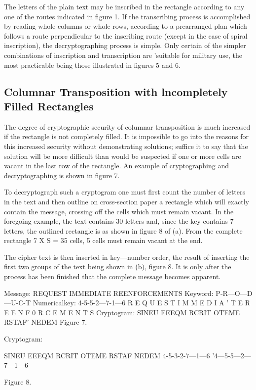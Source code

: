 \mypara The letters of the plain text may be inscribed in the rectangle
according to any one of the routes indicated in figure 1. If the transcribing process is accomplished by reading whole columns or whole
rows, according to a prearranged plan which follows a route perpendicular to the inscribing route (except in the case of spiral inscription), the
decryptographing process is simple. Only certain of the simpler combinations of inscription and transcription are 'suitable for military use, the
most practicable being those illustrated in figures 5 and 6.

\subsection{Columnar Transposition with lncompletely Filled Rectangles}

\mypara The degree of cryptographic security of columnar transposition is
much increased if the rectangle is not completely filled. It is impossible
to go into the reasons for this increased security without demonstrating
solutions; suffice it to say that the solution will be more difficult than
would be suspected if one or more cells are vacant in the last row of the
rectangle. An example of cryptographing and decryptographing is shown
in figure 7.

\mypara To decryptograph such a cryptogram one must first count the
number of letters in the text and then outline on cross-section paper a
rectangle which will exactly contain the message, crossing off the cells
which must remain vacant. In the foregoing example, the text contains
30 letters and, since the key contains 7 letters, the outlined rectangle is as
shown in figure 8 of (a). From the complete rectangle 7 X S = 35 cells,
5 cells must remain vacant at the end.

\mypara The cipher text is then inserted in key—number order, the result of
inserting the first two groups of the text being shown in (b), figure 8.
It is only after the process has been finished that the complete message
becomes apparent.

Message:
REQUEST IMMEDIATE REENFORCEMENTS
Keyword: P-R—O—D—U-C-T
Numericalkey: 4-5-5-2—7-1—6
R E Q U E S T
I M M E D I A '
T E R E E N F
0 R C E M E N
T S
Cryptogram:
SINEU EEEQM RCRIT OTEME RSTAF' NEDEM
Figure 7.

Cryptogram:

SINEU EEEQM RCRIT OTEME RSTAF NEDEM
4-5-3-2-7—1—6 '4—5-5—2—7—1—6

Figure 8.

